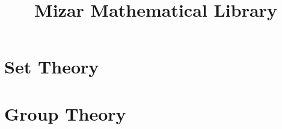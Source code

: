 \documentclass{amsbook}
\title{Mizar Mathematical Library}
\begin{document}
\frontmatter
\maketitle
\tableofcontents

\mainmatter
\chapter{Set Theory}






\chapter{Group Theory}

\end{document}
